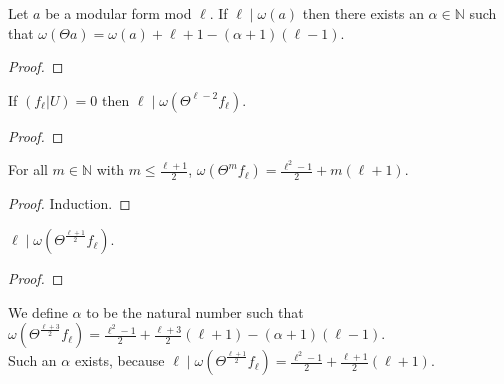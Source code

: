\begin{lemma}
  \label{lem:Filt_Theta_congruence_of_dvd} 
  \leanok
  Let $a$ be a modular form mod $\ell$. If $\ell \mid \omega (a)$ then
  there exists an $\alpha \in \mathbb{N}$ such that 
  $\omega (\Theta a) = \omega (a) + \ell + 1 - (\alpha + 1) (\ell - 1)$.
\end{lemma}
\begin{proof}
  \leanok
\end{proof}


\begin{theorem}
  \label{thm:Filt_Theta_l_sub_two}
  \leanok
  If $(f_\ell | U) = 0$ then $\ell \mid \omega (\Theta^{\ell - 2} f_\ell)$.
\end{theorem}
\begin{proof}
  \leanok
\end{proof}


\begin{lemma}
  \label{lem:Filt_Theta_lel_add_one_div_two}
  \leanok
  For all $m \in \mathbb{N}$ with $m \le \frac{\ell + 1}{2}$,
  $\omega (\Theta^m f_\ell) = \frac{\ell^2 - 1}{2} + m (\ell + 1)$.
\end{lemma}
\begin{proof}
  \leanok
  Induction.
\end{proof}


\begin{theorem}
  \label{thm:Filt_Theta_l_add_one_div_two}
  \leanok
  $\ell \mid \omega (\Theta^{\frac{\ell + 1}{2}} f_\ell)$.
\end{theorem}
\begin{proof}
  \leanok
\end{proof}


\begin{definition}
  \label{def:alpha}
  \leanok
  We define $\alpha$ to be the natural number such that 
  $\omega (\Theta^{\frac{\ell + 3}{2}} f_\ell) = \frac{\ell^2 - 1}{2} + \frac{\ell + 3}{2} (\ell + 1) - (\alpha + 1) (\ell - 1)$. \\
  Such an $\alpha$ exists, because 
  $\ell \mid \omega (\Theta^{\frac{\ell + 1}{2}} f_\ell) = \frac{\ell^2 - 1}{2} + \frac{\ell + 1}{2} (\ell + 1)$.
\end{definition}

